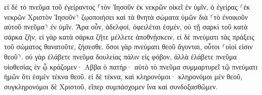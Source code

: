\documentclass{openreader}
\begin{document}
εἰ δὲ τὸ πνεῦμα τοῦ ἐγείραντος ⸀τὸν Ἰησοῦν ἐκ νεκρῶν οἰκεῖ ἐν ὑμῖν, ὁ ἐγείρας ⸂ἐκ νεκρῶν Χριστὸν Ἰησοῦν⸃ ζῳοποιήσει καὶ τὰ θνητὰ σώματα ὑμῶν διὰ ⸂τὸ ἐνοικοῦν αὐτοῦ πνεῦμα⸃ ἐν ὑμῖν. 
Ἄρα οὖν, ἀδελφοί, ὀφειλέται ἐσμέν, οὐ τῇ σαρκὶ τοῦ κατὰ σάρκα ζῆν, 
εἰ γὰρ κατὰ σάρκα ζῆτε μέλλετε ἀποθνῄσκειν, εἰ δὲ πνεύματι τὰς πράξεις τοῦ σώματος θανατοῦτε, ζήσεσθε. 
ὅσοι γὰρ πνεύματι θεοῦ ἄγονται, οὗτοι ⸂υἱοί εἰσιν θεοῦ⸃. 
οὐ γὰρ ἐλάβετε πνεῦμα δουλείας πάλιν εἰς φόβον, ἀλλὰ ἐλάβετε πνεῦμα υἱοθεσίας ἐν ᾧ κράζομεν· Αββα ὁ πατήρ· 
αὐτὸ τὸ πνεῦμα συμμαρτυρεῖ τῷ πνεύματι ἡμῶν ὅτι ἐσμὲν τέκνα θεοῦ. 
εἰ δὲ τέκνα, καὶ κληρονόμοι· κληρονόμοι μὲν θεοῦ, συγκληρονόμοι δὲ Χριστοῦ, εἴπερ συμπάσχομεν ἵνα καὶ συνδοξασθῶμεν. 
\end{document}
